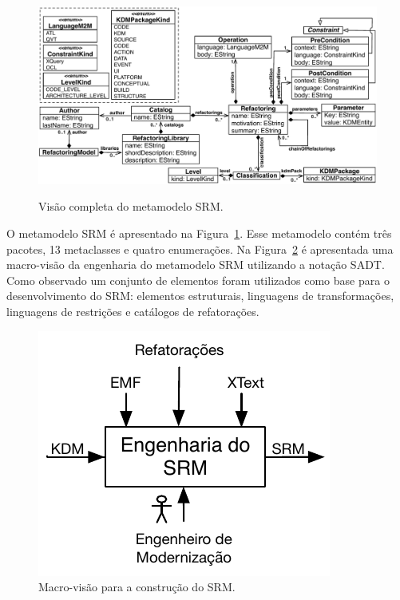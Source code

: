 \begin{figure}[h]
	\centering
		\caption{Visão completa do metamodelo SRM.}
	\includegraphics[scale=0.65]{images/newMetamodelSRM}
	\label{fig:meta_modelo_SRM}
	\fautor
\end{figure}

O metamodelo SRM é apresentado na Figura~\ref{fig:meta_modelo_SRM}. Esse metamodelo contém três pacotes, 13 metaclasses e quatro enumerações. Na Figura~\ref{fig:fases_para_a_construcao_e_uso_do_SRM} é apresentada uma macro-visão da engenharia do metamodelo SRM utilizando a notação SADT. Como observado um conjunto de elementos foram utilizados como base para o desenvolvimento do SRM: elementos estruturais, linguagens de transformações, linguagens de restrições e catálogos de refatorações. %

\begin{figure}[h]
	\centering
	\caption{Macro-visão para a construção do SRM.}
	\label{fig:fases_para_a_construcao_e_uso_do_SRM}
	\includegraphics[scale=0.9]{images/engenhariaDoSRM}
	\fautor
\end{figure}

